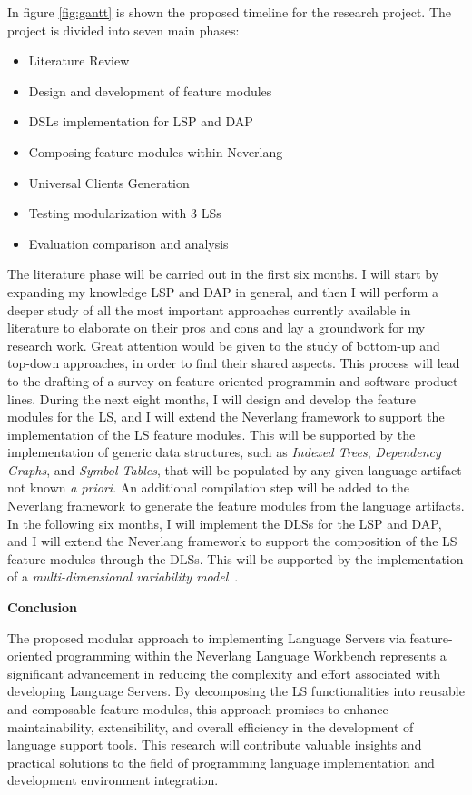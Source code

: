In figure \ref{fig:gantt} is shown the proposed timeline for the research project. The project is divided into seven main phases:
\begin{itemize}
    \item Literature Review
    \item Design and development of feature modules
    \item DSLs implementation for LSP and DAP
    \item Composing feature modules within Neverlang
    \item Universal Clients Generation
    \item Testing modularization with 3 LSs
    \item Evaluation comparison and analysis
\end{itemize}

The literature phase will be carried out in the first six months. I will start by expanding my knowledge LSP and DAP in general, and then I will perform a deeper study of all the most important approaches currently available in literature to elaborate on their pros and cons and lay a groundwork for my research work. Great attention would be given to the study of bottom-up and top-down approaches, in order to find their shared aspects. This process will lead to the drafting of a survey on feature-oriented programmin and software product lines.
During the next eight months, I will design and develop the feature modules for the LS, and I will extend the Neverlang framework to support the implementation of the LS feature modules. This will be supported by the implementation of generic data structures, such as \textit{Indexed Trees}, \textit{Dependency Graphs}, and \textit{Symbol Tables}, that will be populated by any given language artifact not known \textit{a priori}. An additional compilation step will be added to the Neverlang framework to generate the feature modules from the language artifacts.
In the following six months, I will implement the DLSs for the LSP and DAP, and I will extend the Neverlang framework to support the composition of the LS feature modules through the DLSs. This will be supported by the implementation of a \textit{multi-dimensional variability model}~\cite{Rosenmuller11}.




\hfill \break
\noindent
\textbf{Conclusion}

The proposed modular approach to implementing Language Servers via feature-oriented programming within the Neverlang Language Workbench represents a significant advancement in reducing the complexity and effort associated with developing Language Servers. By decomposing the LS functionalities into reusable and composable feature modules, this approach promises to enhance maintainability, extensibility, and overall efficiency in the development of language support tools. This research will contribute valuable insights and practical solutions to the field of programming language implementation and development environment integration.

